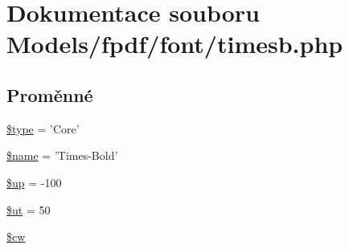 \hypertarget{timesb_8php}{\section{Dokumentace souboru Models/fpdf/font/timesb.php}
\label{timesb_8php}
}
\subsection*{Proměnné}
\begin{DoxyCompactItemize}
\item 
\hyperlink{timesb_8php_a9a4a6fba2208984cabb3afacadf33919}{\$type} = 'Core'
\item 
\hyperlink{timesb_8php_ab2fc40d43824ea3e1ce5d86dee0d763b}{\$name} = 'Times-\/Bold'
\item 
\hyperlink{timesb_8php_a6b5ad2ac55f9df46e8f34e78fbd6f176}{\$up} = -\/100
\item 
\hyperlink{timesb_8php_aadd3f841051043ee58e587e840e8dd0b}{\$ut} = 50
\item 
\hyperlink{timesb_8php_ac2951b03dbb0317e6c61ec920b7479dc}{\$cw}
\end{DoxyCompactItemize}


